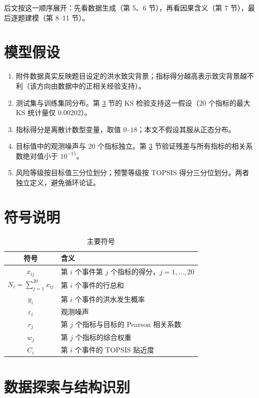 \documentclass{article}
\begin{document}
后文按这一顺序展开：先看数据生成（第 5、6 节），再看因果含义（第 7 节），最后逐题建模（第 8–11 节）。

\section{模型假设}

\begin{enumerate}
  \item 附件数据真实反映题目设定的洪水致灾背景；指标得分越高表示致灾背景越不利（该方向由数据中的正相关经验支持）。
  \item 测试集与训练集同分布。第 \ref{sec:eda} 节的 KS 检验支持这一假设（20 个指标的最大 KS 统计量仅 0.00202）。
  \item 指标得分是离散计数型变量，取值 $0$–$18$；本文不假设其服从正态分布。
  \item 目标值中的观测噪声与 20 个指标独立。第 \ref{sec:eda} 节验证残差与所有指标的相关系数绝对值小于 $10^{-15}$。
  \item 风险等级按目标值三分位划分；预警等级按 TOPSIS 得分三分位划分。两者独立定义，避免循环论证。
\end{enumerate}

\section{符号说明}

\begin{table}[H]
\centering
\caption{主要符号}
\begin{tabular}{cl}
\toprule
符号 & 含义 \\
\midrule
$x_{ij}$ & 第 $i$ 个事件第 $j$ 个指标的得分，$j=1,\dots,20$ \\
$N_i=\sum_{j=1}^{20}x_{ij}$ & 第 $i$ 个事件的行总和 \\
$y_i$ & 第 $i$ 个事件的洪水发生概率 \\
$\varepsilon_i$ & 观测噪声 \\
$r_j$ & 第 $j$ 个指标与目标的 Pearson 相关系数 \\
$w_j$ & 第 $j$ 个指标的综合权重 \\
$C_i$ & 第 $i$ 个事件的 TOPSIS 贴近度 \\
\bottomrule
\end{tabular}
\end{table}

\section{数据探索与结构识别}\label{sec:eda}
\end{document}
